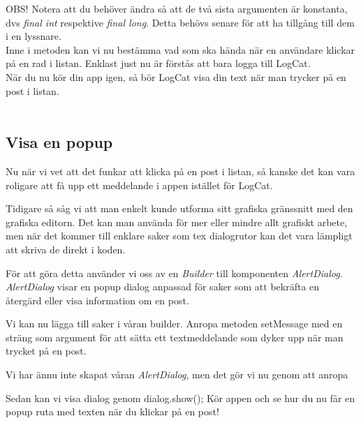 \documentclass[11 pt, titlepage]{article} %
\begin{document}
OBS! Notera att du behöver ändra så att de två sista argumenten är konstanta, dvs \textit{final int} respektive \textit{final long}. Detta behövs senare för att ha tillgång till dem i en lyssnare.\\

Inne i metoden kan vi nu bestämma vad som ska hända när en användare klickar på en rad i listan. Enklast just nu är förstås att bara logga till LogCat.\\

När du nu kör din app igen, så bör LogCat visa din text när man trycker på en post i listan.\\ \\
\subsection{Visa en popup}
Nu när vi vet att det funkar att klicka på en post i listan, så kanske det kan vara roligare att få upp ett meddelande i appen istället för LogCat.

Tidigare så såg vi att man enkelt kunde utforma sitt grafiska gränssnitt med den grafiska editorn. Det kan man använda för mer eller mindre allt grafiskt arbete, men när det kommer till enklare saker som tex dialogrutor kan det vara lämpligt att skriva de direkt i koden.

För att göra detta använder vi oss av en \textit{Builder} till komponenten \textit{AlertDialog}. \textit{AlertDialog} visar en popup dialog anpassad för saker som att bekräfta en återgärd eller visa information om en post.


Vi kan nu lägga till saker i våran builder. Anropa metoden setMessage med en sträng som argument för att sätta ett textmeddelande som dyker upp när man trycket på en post.

Vi har ännu inte skapat våran \textit{AlertDialog}, men det gör vi nu genom att anropa 

Sedan kan vi visa dialog genom dialog.show();
Kör appen och se hur du nu får en popup ruta med texten när du klickar på en post!\\ \\
\end{document}
